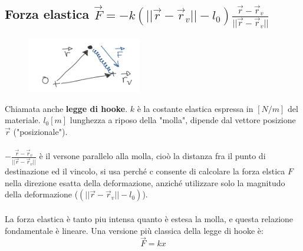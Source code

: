 \subsection{Forza elastica $\vec{F} = -k (||\vec{r} - \vec{r}_v|| - l_0)\frac{\vec{r}-\vec{r}_v}{||\vec{r}-\vec{r}_v||}$}
\begin{figure}
    \vspace{-15pt}
    \centering
    \includegraphics[width=5cm]{images/forza-elastica.png}
\end{figure}
Chiamata anche \textbf{legge di hooke}. $k$ è la costante elastica espressa in $[N/m]$ del materiale. $l_0 [m]$ lunghezza a riposo della "molla", 
dipende dal vettore posizione $\vec{r}$ ("posizionale").\\\\
$-\frac{\vec{r}-\vec{r}_v}{||\vec{r}-\vec{r}_v||}$ è il versone parallelo alla molla, cioò la distanza fra il punto di destinazione ed il vincolo, si usa perché c consente
di calcolare la forza elstica $F$ nella direzione esatta della deformazione, anziché utilizzare solo la magnitudo della deformazione ($(||\vec{r} - \vec{r}_v|| - l_0)$).
\\\\La forza elastica è tanto piu intensa quanto è estesa la molla, e questa relazione fondamentale è lineare. Una versione
più classica della legge di hooke è:
$$\vec{F} = kx$$
